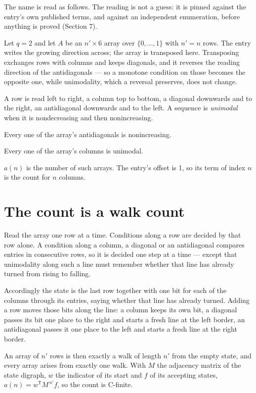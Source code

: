 \documentclass[11pt]{article}
\theoremstyle{definition}
\begin{document}
The name is read as follows. The reading is not a guess: it is pinned against the entry's own published terms, and against an independent enumeration, before anything is proved (Section 7).

Let $q = 2$ and let $A$ be an $n' \times 6$ array over $\{0,\dots,1\}$ with $n' = n$ rows. The entry writes the growing direction across; the array is transposed here. Transposing exchanges rows with columns and keeps diagonals, and it reverses the reading direction of the antidiagonals --- so a monotone condition on those becomes the opposite one, while unimodality, which a reversal preserves, does not change.

A row is read left to right, a column top to bottom, a diagonal downwards and to the right, an antidiagonal downwards and to the left. A sequence is {\itshape unimodal} when it is nondecreasing and then nonincreasing.

Every one of the array's antidiagonals is nonincreasing.

Every one of the array's columns is unimodal.

$a(n)$ is the number of such arrays. The entry's offset is 1, so its term of index $n$ is the count for $n$ columns.

\section{The count is a walk count}

Read the array one row at a time. Conditions along a row are decided by that row alone. A condition along a column, a diagonal or an antidiagonal compares entries in consecutive rows, so it is decided one step at a time --- except that unimodality along such a line must remember whether that line has already turned from rising to falling.

Accordingly the state is the last row together with one bit for each of the columns through its entries, saying whether that line has already turned. Adding a row moves those bits along the line: a column keeps its own bit, a diagonal passes its bit one place to the right and starts a fresh line at the left border, an antidiagonal passes it one place to the left and starts a fresh line at the right border.

An array of $n'$ rows is then exactly a walk of length $n'$ from the empty state, and every array arises from exactly one walk. With $M$ the adjacency matrix of the state digraph, $w$ the indicator of its start and $f$ of its accepting states, $a(n) = w^{\mathsf T}M^{\,n'}f$, so the count is C-finite.
\end{document}
